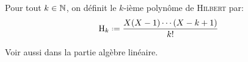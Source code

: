 \begin{tcolorbox}
    Pour tout $k \in \mathbb{N}$, on définit le $k$-ième polynôme de \textsc{Hilbert} par:
    $$\Hilb_k \defeq \frac{X(X-1) \cdots (X-k+1)}{k!}$$
\end{tcolorbox}
Voir aussi  dans la partie algèbre linéaire. 